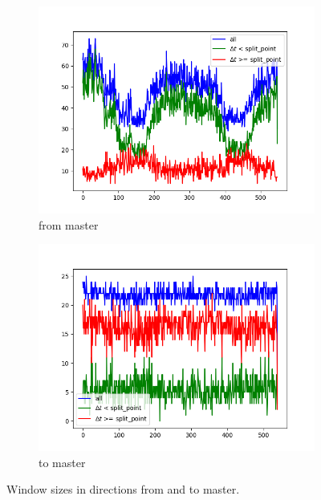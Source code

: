 \begin{figure}
  \centering
  \begin{subfigure}[b]{0.49\textwidth}
    \centering
    \includegraphics[width=\textwidth]{obrazky-figures/from_master.png}
    \caption{from master}
    \label{fig:master_slave}
  \end{subfigure}
  \hfill
  \begin{subfigure}[b]{0.49\textwidth}
    \centering
    \includegraphics[width=\textwidth]{obrazky-figures/to_master.png}
    \caption{to master}
    \label{fig:slave_master}
  \end{subfigure}
  \caption{Window sizes in directions from and to master.}
  \label{fig:window_size_graphs}
\end{figure}

